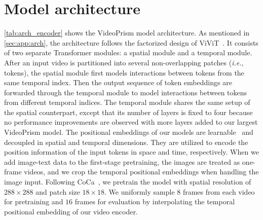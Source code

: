 \documentclass{article}
\theoremstyle{plain}
\theoremstyle{definition}
\theoremstyle{remark}
\newcommand{\OURS}{VideoPrism\xspace}
\newcommand{\ie}{\textit{i.e.}\xspace}
\begin{document}
 \section{Model architecture}
\label{app:architecture}
\cref{tab:arch_encoder} shows the \OURS model architecture.
As mentioned in \cref{sec:app:arch}, the architecture follows the factorized design of ViViT~\cite{arnab2021vivit}. It consists of two separate Transformer modules: a spatial module and a temporal module. After an input video is partitioned into several non-overlapping patches (\ie, tokens), the spatial module first models interactions between tokens from the same temporal index. Then the output sequence of token embeddings are forwarded through the temporal module to model interactions between tokens from different temporal indices. The temporal module shares the same setup of the spatial counterpart, except that its number of layers is fixed to four because no performance improvements are observed with more layers added to our largest \OURS model. The positional embeddings of our models are learnable~\cite{devlin2019bert} and decoupled in spatial and temporal dimensions. They are utilized to encode the position information of the input tokens in space and time, respectively. When we add image-text data to the first-stage pretraining, the images are treated as one-frame videos, and we crop the temporal positional embeddings when handling the image input. Following CoCa~\cite{yu2022coca}, we pretrain the model with spatial resolution of $288 \times 288$ and patch size $18 \times 18$. We uniformly sample $8$ frames from each video for pretraining and $16$ frames for evaluation by interpolating the temporal positional embedding of our video encoder. 
\end{document}
